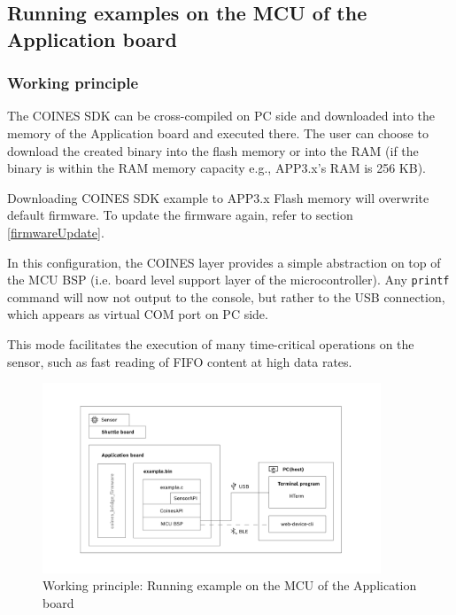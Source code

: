\documentclass{article}
\begin{document}
\subsection{Running examples on the MCU of the Application board}\label{ExampleOnMCU}
\subsubsection{Working principle}
The COINES SDK can be cross-compiled on PC side and downloaded into the memory of the Application board and executed there. The user can choose to download the created binary into the flash memory or into the RAM (if the binary is within the RAM memory capacity e.g., APP3.x's RAM is 256 KB).

Downloading COINES SDK example to APP3.x Flash memory will overwrite default firmware. To update the firmware again, refer to section \ref{firmwareUpdate}.

In this configuration, the COINES layer provides a simple abstraction on top of the MCU BSP (i.e. board level support layer of the microcontroller). Any \texttt{printf} command will now not output to the console, but rather to the USB connection, which appears as virtual COM port on PC side.

This mode facilitates the execution of many time-critical operations on the sensor, such as fast reading of FIFO content at high data rates.

\begin{figure}[H]
	\begin{center}
		\includegraphics[width=0.9\textwidth]{coinesAPI_images/COINES_workingPrinciple_runOnMCU.png}
		\caption{Working principle: Running example on the MCU of the Application board}
	\end{center}
\end{figure}
\end{document}
